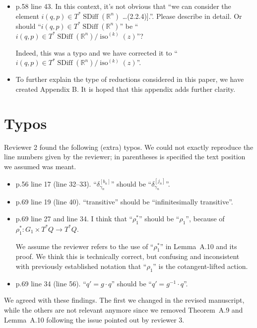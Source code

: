 \documentclass{article}
\def\R{\mathbb{R} }
\def\R{\mathbb{R} }
\DeclareMathOperator{\SDiff}{SDiff}
\DeclareMathOperator{\iso}{iso}
\begin{document}
\begin{itemize}
\item p.58 line 43. In this context, it's not obvious that ``we can
  consider the element $i(q, p) \in T^*\SDiff(\R^n)$ \ldots (2.2.4)].''.
  Please describe in detail. Or should ``$i(q,p) \in T^*\SDiff(\R^n)$''
  be ``$i(q,p) \in T^*\SDiff(\R^n) / \iso^{(k)}(z)$''?

  Indeed, this was a typo and we have corrected it to
  ``$i(q,p) \in T^*\SDiff(\R^n) / \iso^{(k)}(z)$''.
  \item To further explain the type of reductions considered in this paper, we have created Appendix B. It is hoped that this appendix adds further clarity.
\end{itemize}

\clearpage
\section{Typos}
Reviewer 2 found the following (extra) typos. We could not exactly
reproduce the line numbers given by the reviewer; in parentheses is
specified the text position we assumed was meant.
\begin{itemize}
\item p.56 line 17 (line 32--33). ``$\delta_{\gamma_n}^{[b_n]}$'' should be ``$\delta_{\gamma_n}^{[j_n]}$''.
\item p.69 line 19 (line 40). ``transitive'' should be ``infinitesimally transitive''.
\item p.69 line 27 and line 34. I think that ``$\rho_1^*$'' should be
  ``$\rho_1$'', because of $\rho_1^*: G_1 \times T^*Q \to T^*Q$.

  We assume the reviewer refers to the use of ``$\rho_1^*$'' in
  Lemma~A.10 and its proof. We think this is technically correct, but
  confusing and inconsistent with previously established notation that
  ``$\rho_1$'' is the cotangent-lifted action.
\item p.69 line 34 (line 56). ``$q' = g \cdot q$'' should be ``$q' = g^{-1} \cdot q$''.
\end{itemize}

\noindent
We agreed with these findings. The first we changed in the revised
manuscript, while the others are not relevant anymore since we removed
Theorem~A.9 and Lemma~A.10 following the issue pointed out by reviewer 3. 
\end{document}
